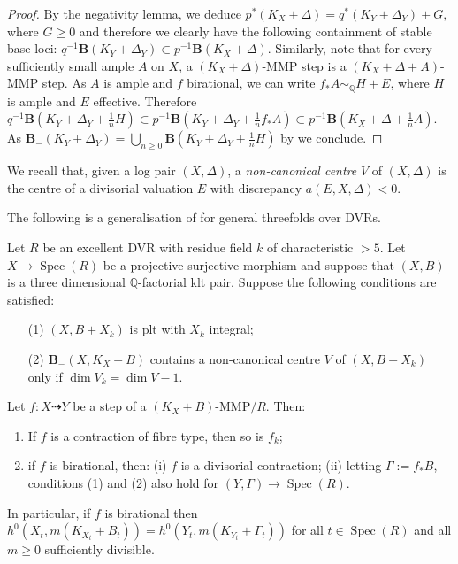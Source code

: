 \documentclass[a4paper,12pt]{book}
\DeclareMathOperator{\Spec}{Spec}
\newcommand{\bQ}{\mathbb{Q}}
\begin{document}
	\begin{proof}
		By the negativity lemma, we deduce $p^*(K_X+\Delta)=q^*(K_Y+\Delta_Y)+G,$ where $G \geq 0$ and therefore we clearly have the following containment of stable base loci: $q^{-1}\mathbf{B}(K_Y+\Delta_Y) \subset p^{-1}\mathbf{B}(K_X+\Delta).$
		Similarly, note that for every sufficiently small ample $A$ on $X$,
		a $(K_X+\Delta)$-MMP step is a $(K_X+\Delta+A)$-MMP step. As $A$ is ample and $f$ birational, we can write $f_*A \sim_{\mathbb{Q}} H+E$, where $H$ is ample and $E$ effective. 
		Therefore  $q^{-1}\mathbf{B}(K_Y+\Delta_Y+\frac{1}{n}H) \subset p^{-1}\mathbf{B}(K_Y+\Delta_Y+ \frac{1}{n}f_*A)\subset  p^{-1}\mathbf{B}(K_X+\Delta+ \frac{1}{n}A) $.
		As $\mathbf{B}_{-}(K_Y+\Delta_Y)=\bigcup_{n \geq 0} \mathbf{B}(K_Y+\Delta_Y+\frac{1}{n}H)$ by \cite[Proposition 1.19]{asympt-baseloci} we conclude.
	\end{proof}

	We recall that, given a log pair $(X,\Delta)$, a \emph{non-canonical centre} $V$ of $(X,\Delta)$ is the centre of a divisorial valuation $E$ with discrepancy $a(E, X, \Delta)<0$.  

The following is a generalisation of \cite[Lemma 3.1]{HMX18} for general threefolds over DVRs. 
	
	\begin{proposition}\label{lemma:MMP_in_fam2}
		Let $R$ be an excellent DVR with residue field $k$ of characteristic $>5$. Let $X \to \Spec(R)$ be a projective surjective morphism and suppose that $(X,B)$ is a three dimensional $\bQ$-factorial klt pair.
		Suppose the following conditions are satisfied:
		\begin{itemize}
		\item[(1)] $(X,B+X_k)$ is plt with $X_k$ integral;
		\item[(2)] ${\mathbf{B}_{-}(X, K_{X}+B)}$ contains a non-canonical centre $V$ of $(X,B+X_{k})$ only if $\dim V_{k}=\dim V -1$.
		\end{itemize}
		Let $f \colon X\dashrightarrow Y$ be a step of a $(K_X+B)$-MMP$/R$. Then:
		\begin{enumerate}
			\item  If $f$ is a contraction of fibre type, then so is $f_k$;
			\item if $f$ is birational, then:
			\subitem(i) $f$ is a divisorial contraction;
			\subitem(ii) letting $\Gamma:=f_\ast B$, conditions (1) and (2) also hold for $(Y,\Gamma)\to\Spec (R)$.
		\end{enumerate} 
		In particular, if $f$ is birational then $h^0(X_t,m(K_{X_t}+B_t))=h^0(Y_t,m(K_{Y_t}+\Gamma_t))$ for all $t\in\Spec (R)$ and all $m\geq 0$ sufficiently divisible.
	\end{proposition}
	
\end{document}
